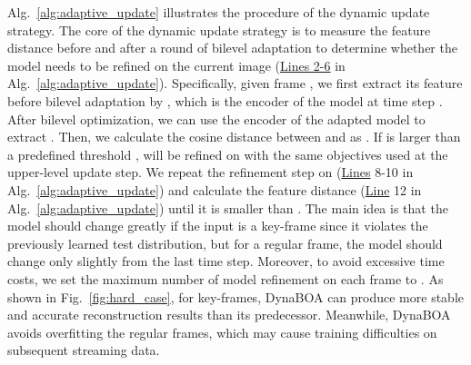 \documentclass[10pt,journal,compsoc]{IEEEtran}
\newcommand{\fig}[1]{Fig.~\ref{#1}}
\newcommand{\alg}[1]{Alg.~\ref{#1}}
\begin{document}
\alg{alg:adaptive_update} illustrates the procedure of the dynamic update strategy.
The core of the dynamic update strategy is to measure the feature distance before and after a round of bilevel adaptation to determine whether the model  needs to be refined on the current image (\underline{Lines 2-6} in \alg{alg:adaptive_update}).
Specifically, given frame , we first extract its feature  before bilevel adaptation by , which is the encoder of the model at time step .
After bilevel optimization, we can use the encoder  of the adapted model to extract . 
Then, we calculate the cosine distance between  and  as .
If  is larger than a predefined threshold ,  will be refined on  with the same objectives used at the upper-level update step.
We repeat the refinement step on  (\underline{Lines} 8-10 in \alg{alg:adaptive_update}) and calculate the feature distance (\underline{Line} 12 in \alg{alg:adaptive_update}) until it is smaller than .
The main idea is that the model should change greatly if the input is a key-frame since it violates the previously learned test distribution, but for a regular frame, the model should change only slightly from the last time step.
Moreover, to avoid excessive time costs, we set the maximum number of model refinement on each frame to .
As shown in \fig{fig:hard_case}, for key-frames, DynaBOA can produce more stable and accurate reconstruction results than its predecessor. Meanwhile, DynaBOA avoids overfitting the regular frames, which may cause training difficulties on subsequent streaming data.
\end{document}
